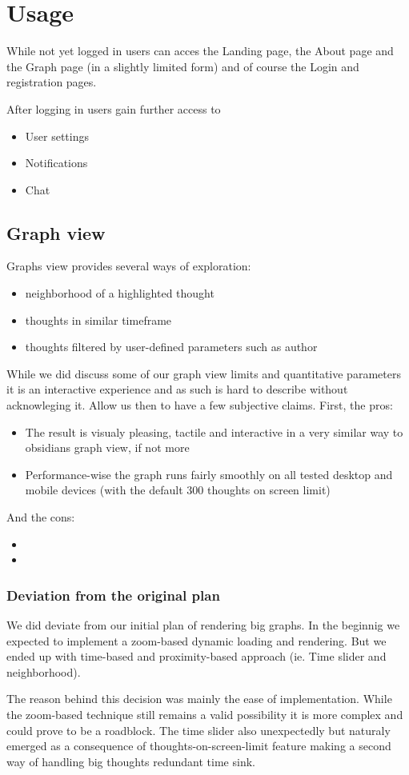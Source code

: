 \section{Usage}
While not yet logged in users can acces the Landing page, the About page and the Graph page (in a slightly limited form) and of course the Login and registration pages.

After logging in users gain further access to
\begin{itemize}
    \item User settings
    \item Notifications
    \item Chat
\end{itemize}

\subsection{Graph view}
Graphs view provides several ways of exploration:
\begin{itemize}
    \item neighborhood of a highlighted thought
    \item thoughts in similar timeframe
    \item thoughts filtered by user-defined parameters such as author 
\end{itemize}

While we did discuss some of our graph view limits and quantitative parameters it is an interactive experience and as such is hard to describe without acknowleging it.
Allow us then to have a few subjective claims.
First, the pros:
\begin{itemize}
    \item The result is visualy pleasing, tactile and interactive in a very similar way to obsidians graph view, if not more
    \item Performance-wise the graph runs fairly smoothly on all tested desktop and mobile devices (with the default 300 thoughts on screen limit)
\end{itemize}
And the cons:
\begin{itemize}
    \item 
    \item 
\end{itemize}



\subsubsection*{Deviation from the original plan}
We did deviate from our initial plan of rendering big graphs.
In the beginnig we expected to implement a zoom-based dynamic loading and rendering.
But we ended up with time-based and proximity-based approach (ie. Time slider and neighborhood).

The reason behind this decision was mainly the ease of implementation.
While the zoom-based technique still remains a valid possibility it is more complex and could prove to be a roadblock.
The time slider also unexpectedly but naturaly emerged as a consequence of thoughts-on-screen-limit feature making a second way of handling big thoughts redundant time sink.
